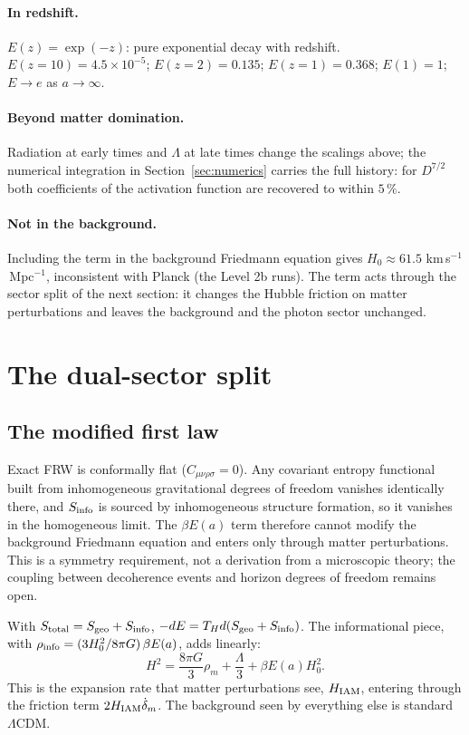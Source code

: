 \paragraph{In redshift.} $E(z)=\exp(-z)$: pure exponential decay with redshift. $E(z{=}10)=4.5\times10^{-5}$; $E(z{=}2)=0.135$; $E(z{=}1)=0.368$;
$E(1)=1$; $E\to e$ as $a\to\infty$. \calc

\paragraph{Beyond matter domination.} Radiation at early times and $\Lambda$ at late times change the scalings above; the numerical integration in
Section~\ref{sec:numerics} carries the full history: for $D^{7/2}$ both coefficients of the activation function are recovered to within $5\,\%$.

\paragraph{Not in the background.} Including the term in the background Friedmann equation gives $H_0\approx61.5$ km\,s$^{-1}$\,Mpc$^{-1}$, inconsistent with
Planck (the Level 2b runs). The term acts through the sector split of the next section: it changes the Hubble friction on matter perturbations and leaves
the background and the photon sector unchanged.

\section{The dual-sector split}
\subsection{The modified first law}
Exact FRW is conformally flat ($C_{\mu\nu\rho\sigma}=0$). Any covariant entropy functional built from inhomogeneous gravitational degrees of freedom
vanishes identically there, and $S_{\rm info}$ is sourced by inhomogeneous structure formation, so it vanishes in the homogeneous limit. The $\beta E(a)$
term therefore cannot modify the background Friedmann equation and enters only through matter perturbations. This is a symmetry requirement, not a
derivation from a microscopic theory; the coupling between decoherence events and horizon degrees of freedom remains open.

With $S_{\rm total}=S_{\rm geo}+S_{\rm info}$, $-dE=T_Hd(S_{\rm geo}+S_{\rm info})$. The informational piece, with
$\rho_{\rm info}=(3H_0^2/8\pi G)\,\beta E(a)$, adds linearly:
\begin{equation}H^2=\frac{8\pi G}{3}\rho_m+\frac\Lambda3+\beta E(a)H_0^2 .\label{eq:HIAM}\end{equation}
This is the expansion rate that matter perturbations see, $H_{\rm IAM}$, entering through the friction term $2H_{\rm IAM}\dot\delta_m$. The background
seen by everything else is standard $\Lambda$CDM.

